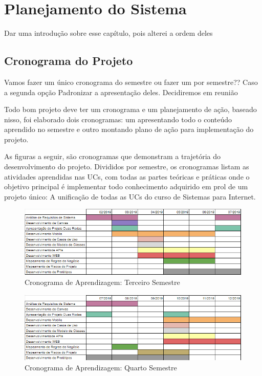 \chapter{Planejamento do Sistema}

{\color{red} Dar uma introdução sobre esse capítulo, pois alterei a ordem deles}

\section{Cronograma do Projeto}


{\color{red} Vamos fazer um único cronograma do semestre ou fazer um por semestre?? Caso a segunda opção Padronizar a apresentação deles. Decidiremos em reunião }


Todo bom projeto deve ter um cronograma e um planejamento de ação, baseado nisso, foi elaborado dois cronogramas: um apresentando todo o conteúdo aprendido no semestre e outro montando plano de ação para implementação do projeto.

As figuras a seguir, são cronogramas que demonstram a trajetória do desenvolvimento do projeto. Divididos por semestre, os cronogramas listam as atividades aprendidas nas UCs, com todas as partes teóricas e práticas onde o objetivo principal é implementar todo conhecimento adquirido em prol de um projeto único: A unificação de todas as UCs do curso de Sistemas para Internet.

\begin{figure}[htb]
	\caption{\label{cron-3-semestre}Cronograma de Aprendizagem: Terceiro Semestre}
	\begin{center}
		\includegraphics[scale=0.90]{./Figuras/cronograma-3-semestre.png}
	\end{center}
\end{figure}


\begin{figure}[htb]
	\caption{\label{cron-4-semestre}Cronograma de Aprendizagem: Quarto Semestre}
	\begin{center}
		\includegraphics[scale=0.90]{./Figuras/cronograma-4-semestre.png}
	\end{center}
\end{figure}



